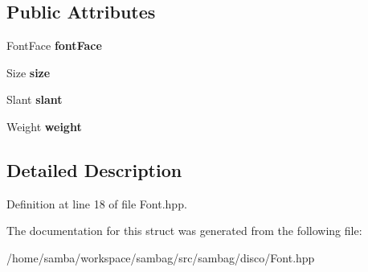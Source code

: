 \subsection*{Public Attributes}
\begin{DoxyCompactItemize}
\item 
\hypertarget{structsambag_1_1disco_1_1_font_a21aa90735405d5f6489cbfc8b68e034e}{
FontFace {\bfseries fontFace}}
\label{structsambag_1_1disco_1_1_font_a21aa90735405d5f6489cbfc8b68e034e}

\item 
\hypertarget{structsambag_1_1disco_1_1_font_adad2ee9d3e0e963ecae553137b3809c7}{
Size {\bfseries size}}
\label{structsambag_1_1disco_1_1_font_adad2ee9d3e0e963ecae553137b3809c7}

\item 
\hypertarget{structsambag_1_1disco_1_1_font_ab67cc52b9b8edff0b3edab4c1af493a9}{
Slant {\bfseries slant}}
\label{structsambag_1_1disco_1_1_font_ab67cc52b9b8edff0b3edab4c1af493a9}

\item 
\hypertarget{structsambag_1_1disco_1_1_font_aa1ef1ba648c6a98fe709ab2dd8f69dc0}{
Weight {\bfseries weight}}
\label{structsambag_1_1disco_1_1_font_aa1ef1ba648c6a98fe709ab2dd8f69dc0}

\end{DoxyCompactItemize}


\subsection{Detailed Description}


Definition at line 18 of file Font.hpp.



The documentation for this struct was generated from the following file:\begin{DoxyCompactItemize}
\item 
/home/samba/workspace/sambag/src/sambag/disco/Font.hpp\end{DoxyCompactItemize}
